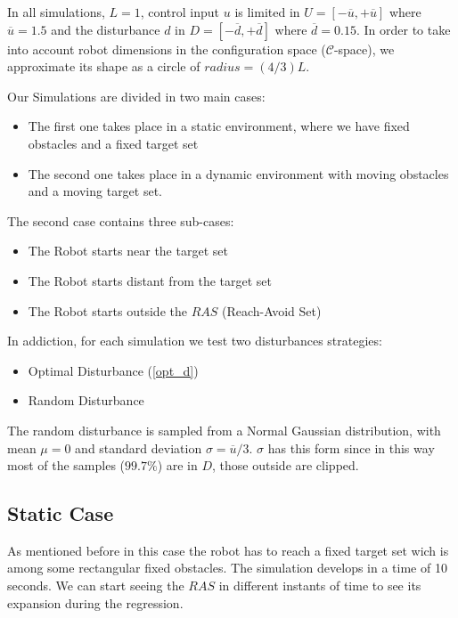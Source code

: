 In all simulations, $L=1$, control input $u$ is limited in $U = [-\overline{u}, +\overline{u}]$ where $\overline{u}=1.5$ and the disturbance $d$ in $D=[-\overline{d}, +\overline{d}]$ where $\overline{d}=0.15$. In order to take into account robot dimensions in the configuration space ($\mathcal{C}$-space), we approximate its shape as a circle of $radius = (4/3)L$.

Our Simulations are divided in two main cases: 
\begin{itemize}
    \item The first one takes place in a static environment, where we have fixed obstacles and a fixed target set 
    \item The second one takes place in a dynamic environment with moving obstacles and a moving target set.
\end{itemize}
The second case contains three sub-cases:  
\begin{itemize}
    \item The Robot starts near the target set
    \item The Robot starts distant from the target set
    \item The Robot starts outside the $RAS$ (Reach-Avoid Set)
\end{itemize}
In addiction, for each simulation we test two disturbances strategies: 
\begin{itemize}
    \item Optimal Disturbance (\ref{opt_d})
    \item Random Disturbance 
\end{itemize}
The random disturbance is sampled from a Normal Gaussian distribution, with mean $\mu=0$ and standard deviation $\sigma=\overline{u}/3$. $\sigma$ has this form since in this way most of the samples ($99.7\%$) are in $D$, those outside are clipped.

\subsection{Static Case}
    As mentioned before in this case the robot has to reach a fixed target set wich is among some rectangular fixed obstacles. The simulation develops in a time of 10 seconds.
    We can start seeing the $RAS$ in different instants of time to see its expansion during the regression.
    
